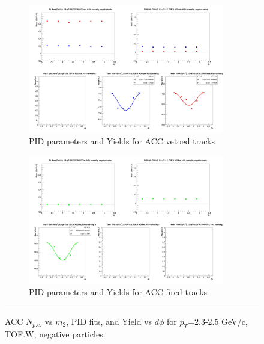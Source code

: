\begin{figure}[H]
  \ContinuedFloat
    \vspace*{-1cm}
    \begin{subfigure}{1\textwidth}
   \centering
   \includegraphics[width=0.94\textwidth]{hiptfits/neg/fitParams_tof2_cent0_ch0_pT-23-25.jpg}
    \caption{PID parameters and Yields for ACC vetoed tracks}
    \end{subfigure}    
    \begin{subfigure}{1\textwidth}
   \centering
   \includegraphics[width=0.94\textwidth]{hiptfits/neg/fitParams_tof3_cent0_ch0_pT-23-25.jpg}
    \caption{PID parameters and Yields for ACC fired tracks}
    \end{subfigure} 
    \rule{35em}{0.5pt}
  \caption[ACC $N_{p.e.}$ vs $m_2$, PID fits, and Yield vs $d\phi$ for $p_T$=2.3-2.5 GeV/c, TOF.W, negative particles.]{ACC $N_{p.e.}$ vs $m_2$, PID fits, and Yield vs $d\phi$ for $p_T$=2.3-2.5 GeV/c, TOF.W, negative particles.}
  \label{fig:acc23-25neg}
\end{figure}


